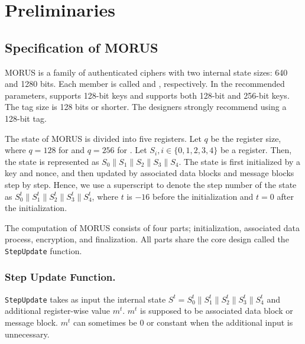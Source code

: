 \documentclass{llncs}
\begin{document}
\section{Preliminaries}
\subsection{Specification of MORUS}
MORUS is a family of authenticated ciphers with two internal state sizes: 640 and 1280 bits. Each member is called  and , respectively. In the recommended parameters,  supports 128-bit keys and  supports both 128-bit and 256-bit keys. The tag size is 128 bits or shorter. The designers strongly recommend using a 128-bit tag.

The state of MORUS is divided into five registers. Let $q$ be the register size, where $q = 128$ for  and $q=256$ for . Let $S_i, i \in\{0,1,2,3,4\}$ be a register. Then, the state is represented as $S_0\|S_1\|S_2\|S_3\|S_4$. The state is first initialized by a key and nonce, and then updated by associated data blocks and message blocks step by step. Hence, we use a superscript to denote the step number of the state as $S^t_0\|S^t_1\|S^t_2\|S^t_3\|S^t_4$, where $t$ is $-16$ before the initialization and $t=0$ after the initialization.

The computation of MORUS consists of four parts; initialization, associated data process, encryption, and finalization. All parts share the core design called the {\tt StepUpdate} function. %

\subsubsection{Step Update Function.}
{\tt StepUpdate} takes as input the internal state $S^t = S^t_0\|S^t_1\|S^t_2\|S^t_3\|S^t_4$ and additional register-wise value $m^t$. $m^t$ is supposed to be associated data block or message block. $m^t$ can sometimes be 0 or constant when the additional input is unnecessary.
\end{document}
